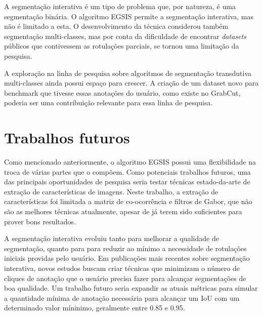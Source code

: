A segmentação interativa é um tipo de problema que, por natureza, é
uma segmentação binária. O algoritmo \gls{EGSIS} permite a segmentação
interativa, mas não é limitado a esta. O desenvolvimento da técnica
considerou também segmentação multi-classes, mas por conta da
dificuldade de encontrar \textit{datasets} públicos que contivessem as
rotulações parciais, se tornou uma limitação da pesquisa.

A exploração na linha de pesquisa sobre algoritmos de segmentação
transdutiva multi-classes ainda possui espaço para crescer. A criação
de um dataset novo para benchmark que tivesse essas anotações do
usuário, como existe no GrabCut, poderia ser uma contribuição
relevante para essa linha de pesquisa.


\section{Trabalhos futuros}\label{sec:trabalhos-futuros}

Como mencionado anteriormente, o algoritmo \gls{EGSIS} possui uma
flexibilidade na troca de várias partes que o compõem. Como potenciais
trabalhos futuros, uma das principais oportunidades de pesquisa seria
testar técnicas estado-da-arte de extração de características de
imagens. Neste trabalho, a extração de características foi limitada a
matriz de co-ocorrência e filtros de Gabor, que não são as melhores
técnicas atualmente, apesar de já terem sido suficientes para prover
bons resultados.

A segmentação interativa evoluiu tanto para melhorar a qualidade de
segmentação, quanto para para reduzir ao mínimo a necessidade de
rotulações iniciais providas pelo usuário. Em publicações mais
recentes sobre segmentação interativa, novos estudos buscam criar
técnicas que minimizam o número de cliques de anotação que o usuário
precisa fazer para alcançar segmentações de boa qualidade. Um trabalho
futuro seria expandir as atuais métricas para simular a quantidade
mínima de anotação necessária para alcançar um IoU com um determinado
valor míninimo, geralmente entre 0.85 e 0.95.
